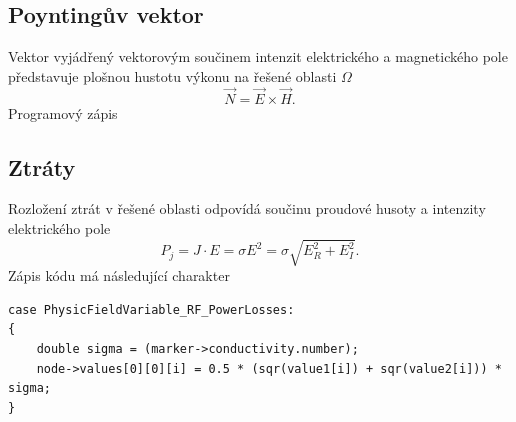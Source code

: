 \subsection*{Poyntingův vektor}
Vektor vyjádřený vektorovým součinem intenzit elektrického a magnetického pole představuje plošnou hustotu výkonu na řešené oblasti $\Omega$
\begin{displaymath}
	\vec N = \vec E \times\vec H.
\end{displaymath}
Programový zápis  

\subsection*{Ztráty}
Rozložení ztrát v řešené oblasti odpovídá součinu proudové husoty a intenzity elektrického pole 
\begin{displaymath}
	P_j = J \cdot E = \sigma E^{2} = \sigma \sqrt{E_{R}^{2} + E_{I}^{2}}.
\end{displaymath}
Zápis kódu má následující charakter
\begin{verbatim}
case PhysicFieldVariable_RF_PowerLosses:
{
    double sigma = (marker->conductivity.number);
    node->values[0][0][i] = 0.5 * (sqr(value1[i]) + sqr(value2[i])) * sigma;
}
\end{verbatim}
